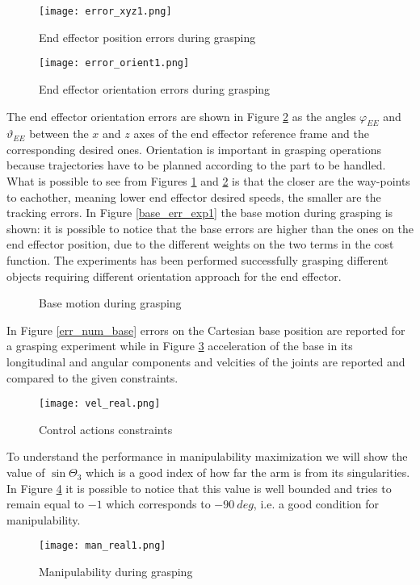 \begin{figure}[h!]
\centering
\texttt{[image: error\_xyz1.png]}
\caption{End effector position errors during grasping}
\label{error_xyz1}
\end{figure}
\begin{figure}[h!]
\centering
\texttt{[image: error\_orient1.png]}
\caption{End effector orientation errors during grasping}
\label{error_orient1}
\end{figure}
The end effector orientation errors are shown in Figure \ref{error_orient1} as the angles $\varphi_{EE}$ and $\vartheta_{EE}$ between the $x$ and $z$ axes of the end effector reference frame and the corresponding desired ones. Orientation is important in grasping operations because trajectories have to be planned according to the part to be handled. What is possible to see from Figures \ref{error_xyz1} and \ref{error_orient1} is that the closer are the way-points to eachother, meaning lower end effector desired speeds, the smaller are the tracking errors. In Figure \ref{base_err_exp1} the base motion during grasping is shown: it is possible to notice that the base errors are higher than the ones on the end effector position, due to the different weights on the two terms in the cost function.
The experiments has been performed successfully grasping different objects requiring different orientation approach for the end effector.  

\begin{figure}%
\centering
{}%
\qquad
{}%
\caption{Base motion during grasping}
\end{figure}

In Figure \ref{err_num_base} errors on the Cartesian base position are reported for a grasping experiment while in Figure \ref{vel_real} acceleration of the base in its longitudinal and angular components and velcities of the joints are reported and compared to the given constraints.

\begin{figure}[h!]
\centering
\texttt{[image: vel\_real.png]}
\caption{Control actions constraints}
\label{vel_real}
\end{figure}
To understand the performance in manipulability maximization we will show the value of $\sin\Theta_3$ which is a good index of how far the arm is from its singularities. In Figure \ref{man_real1} it is possible to notice that this value is well bounded and tries to remain equal to $-1$ which corresponds to $-90\ deg$, i.e. a good condition for manipulability.
\begin{figure}[h!]
\centering
\texttt{[image: man\_real1.png]}
\caption{Manipulability during grasping}
\label{man_real1}
\end{figure}
